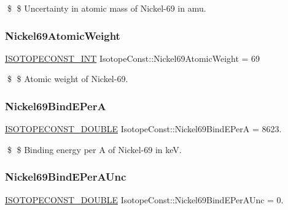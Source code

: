 \$ \$ Uncertainty in atomic mass of Nickel-\/69 in amu. \mbox{\label{group___isotope_const-_nickel-_ni69_ga40603a38fda5542ac7696b42f20e1829}} 
\subsubsection{\texorpdfstring{Nickel69\+Atomic\+Weight}{Nickel69AtomicWeight}}
{\footnotesize\ttfamily \mbox{\hyperlink{group___isotope_const-_macros_ga5f18360b3e99483a35c32d789e62621c}{I\+S\+O\+T\+O\+P\+E\+C\+O\+N\+S\+T\+\_\+\+I\+NT}} Isotope\+Const\+::\+Nickel69\+Atomic\+Weight = 69}

\$ \$ Atomic weight of Nickel-\/69. \mbox{\label{group___isotope_const-_nickel-_ni69_ga8464e47c47c2955c20c8feed1a39b305}} 
\subsubsection{\texorpdfstring{Nickel69\+Bind\+E\+PerA}{Nickel69BindEPerA}}
{\footnotesize\ttfamily \mbox{\hyperlink{group___isotope_const-_macros_ga8f45a7272ce02c0b4c65c44636ed719a}{I\+S\+O\+T\+O\+P\+E\+C\+O\+N\+S\+T\+\_\+\+D\+O\+U\+B\+LE}} Isotope\+Const\+::\+Nickel69\+Bind\+E\+PerA = 8623.}

\$ \$ Binding energy per A of Nickel-\/69 in keV. \mbox{\label{group___isotope_const-_nickel-_ni69_ga85a3eab7f931f54b91a550f919958bb0}} 
\subsubsection{\texorpdfstring{Nickel69\+Bind\+E\+Per\+A\+Unc}{Nickel69BindEPerAUnc}}
{\footnotesize\ttfamily \mbox{\hyperlink{group___isotope_const-_macros_ga8f45a7272ce02c0b4c65c44636ed719a}{I\+S\+O\+T\+O\+P\+E\+C\+O\+N\+S\+T\+\_\+\+D\+O\+U\+B\+LE}} Isotope\+Const\+::\+Nickel69\+Bind\+E\+Per\+A\+Unc = 0.}


